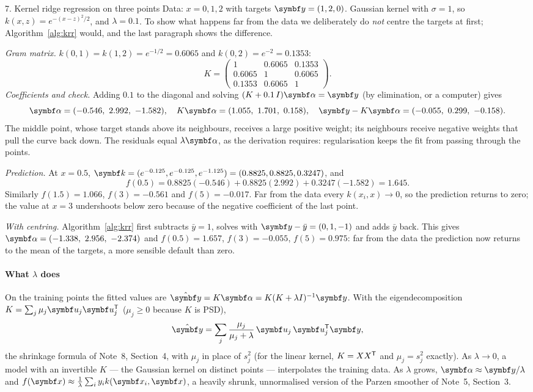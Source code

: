 \documentclass[11pt]{article}
\newcommand{\y}{\vect{y}}
\newcommand{\valpha}{\vect{\alpha}}
\newcommand{\kv}{\vect{k}}
\begin{document}
\begin{worked}{7. Kernel ridge regression on three points}
Data: $x = 0, 1, 2$ with targets $\y = (1, 2, 0)$. Gaussian kernel with $\sigma = 1$, so $k(x, z) = e^{-(x - z)^2/2}$,
and $\lambda = 0.1$. To show what happens far from the data we deliberately do \emph{not} centre the targets at first;
Algorithm~\ref{alg:krr} would, and the last paragraph shows the difference.

\emph{Gram matrix.} $k(0, 1) = k(1, 2) = e^{-1/2} = 0.6065$ and $k(0, 2) = e^{-2} = 0.1353$:
\[
  K = \begin{pmatrix} 1 & 0.6065 & 0.1353 \\ 0.6065 & 1 & 0.6065 \\ 0.1353 & 0.6065 & 1 \end{pmatrix}.
\]
\emph{Coefficients and check.} Adding $0.1$ to the diagonal and solving $(K + 0.1\,I)\valpha = \y$ (by elimination, or a
computer) gives
\[
  \valpha = (-0.546,\ 2.992,\ -1.582), \quad K\valpha = (1.055,\ 1.701,\ 0.158), \quad
  \y - K\valpha = (-0.055,\ 0.299,\ -0.158).
\]
The middle point, whose target stands above its neighbours, receives a large positive weight; its neighbours receive
negative weights that pull the curve back down. The residuals equal $\lambda\valpha$, as the derivation requires:
regularisation keeps the fit from passing through the points.

\emph{Prediction.} At $x = 0.5$, $\kv = (e^{-0.125}, e^{-0.125}, e^{-1.125}) = (0.8825, 0.8825, 0.3247)$, and
\[
  f(0.5) = 0.8825(-0.546) + 0.8825(2.992) + 0.3247(-1.582) = 1.645 .
\]
Similarly $f(1.5) = 1.066$, $f(3) = -0.561$ and $f(5) = -0.017$. Far from the data every $k(x_i, x) \to 0$, so the
prediction returns to zero; the value at $x = 3$ undershoots below zero because of the negative coefficient of the last
point.

\emph{With centring.} Algorithm~\ref{alg:krr} first subtracts $\bar y = 1$, solves with $\y - \bar y = (0, 1, -1)$ and
adds $\bar y$ back. This gives $\valpha = (-1.338,\ 2.956,\ -2.374)$ and $f(0.5) = 1.657$, $f(3) = -0.055$, $f(5) = 0.975$:
far from the data the prediction now returns to the mean of the targets, a more sensible default than zero.
\end{worked}

\paragraph{What $\lambda$ does} On the training points the fitted values are $\hat{\y} = K\valpha = K(K + \lambda I)^{-1}\y$.
With the eigendecomposition $K = \sum_j \mu_j\vect{u}_j\vect{u}_j\T$ ($\mu_j \ge 0$ because $K$ is PSD),
\[
  \hat{\y} = \sum_j \frac{\mu_j}{\mu_j + \lambda}\, \vect{u}_j\,\vect{u}_j\T\y ,
\]
the shrinkage formula of Note~8, Section~4, with $\mu_j$ in place of $s_j^2$ (for the linear kernel, $K = XX^{\mathsf{T}}$ and
$\mu_j = s_j^2$ exactly). As $\lambda \to 0$, a model with an invertible $K$ --- the Gaussian kernel on distinct points
--- interpolates the training data. As $\lambda$ grows, $\valpha \approx \y/\lambda$ and $f(\x) \approx \frac1\lambda\sum_i
y_ik(\x_i, \x)$, a heavily shrunk, unnormalised version of the Parzen smoother of Note~5, Section~3.
\end{document}
